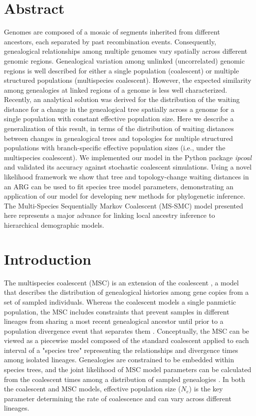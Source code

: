 \documentclass[11pt]{article}
\begin{document}
\section*{Abstract}
Genomes are composed of a mosaic of segments inherited from different ancestors, 
each separated by past recombination events. Consequently, genealogical
relationships among multiple genomes vary spatially across different genomic 
regions. 
Genealogical variation among unlinked 
(uncorrelated) genomic regions is well described for either a single 
population (coalescent) or multiple structured populations (multispecies coalescent).
However, the expected similarity among genealogies at linked regions of a 
genome is less well characterized. 
Recently, an analytical solution was derived for 
the distribution of the waiting distance for a change in the genealogical tree 
spatially across a genome for a single population with constant effective 
population size. Here we describe a generalization of this 
result, in terms of the 
distribution of waiting distances between 
changes in genealogical trees and topologies for multiple structured populations
with branch-specific effective population sizes (i.e., under the multispecies 
coalescent). 
We implemented our model in the Python package \emph{ipcoal} and validated its
accuracy against stochastic coalescent simulations. Using a novel
likelihood framework we show that tree and topology-change waiting distances
in an ARG can be used to fit species tree model parameters, demonstrating an
application of our model for developing new methods for phylogenetic inference.
The Multi-Species Sequentially Markov Coalescent (MS-SMC) model presented here
represents a major advance for linking local ancestry inference to hierarchical
demographic models.


\section{Introduction}
The multispecies coalescent (MSC) is an extension of the coalescent 
\citep{kingman1982coalescent}, a model that describes the distribution of genealogical 
histories among gene copies from a set of sampled individuals. Whereas the 
coalescent models a single panmictic population, the MSC includes constraints that prevent 
samples in different lineages from sharing a most recent genealogical ancestor until prior
to a population divergence event that separates them \citep{maddison1997gene,maddison2006inferring}. 
Conceptually, the MSC can be viewed as a piecewise model composed of the standard
coalescent applied to each interval of a "species tree" representing the relationships
and divergence times among isolated lineages. Genealogies are constrained to be
embedded within species trees, 
and the joint likelihood of 
MSC model parameters can be calculated from the coalescent times among a 
distribution of sampled genealogies
\citep{rannala2003bayes,degnan2009gene}. In both the coalescent
and MSC models, effective population size ($N_e$) is the key parameter determining 
the rate of coalescence and can vary across different lineages. 
\end{document}
